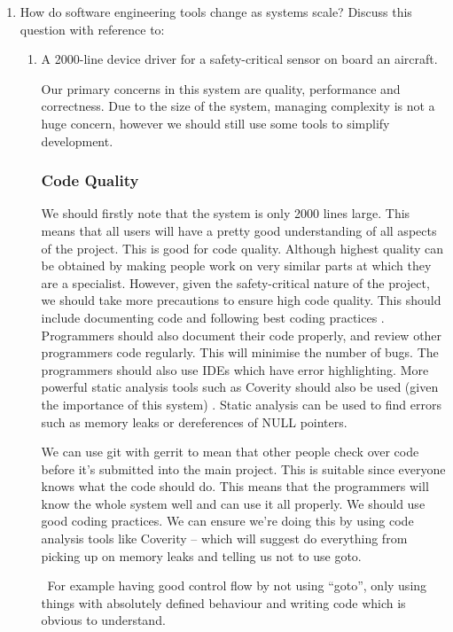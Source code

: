 \documentclass[10pt,\jkfside,a4paper]{article}
\begin{document}
\begin{enumerate}

\item How do software engineering tools change as systems scale?
Discuss this question with reference to:

\begin{enumerate}[label=(\alph*)]

\item A 2000-line device driver for a safety-critical sensor on board an aircraft.

Our primary concerns in this system are quality, performance and correctness.
Due to the size of the system, managing complexity is not a huge concern, however
we should still use some tools to simplify development.

\subsubsection*{Code Quality}

We should firstly note that the system is only 2000 lines large.
This means that all users will have a pretty good understanding of all aspects of the project.
This is good for code quality.
Although highest quality can be obtained by making people work on very similar parts at which they are a specialist.
However, given the safety-critical nature of the project, we should take more precautions to ensure high code quality.
This should include documenting code and following best coding practices \dag.
Programmers should also document their code properly, and review other programmers code regularly. This will minimise
the number of bugs. The programmers should also use IDEs which have error highlighting.
More powerful static analysis tools such as Coverity should also be used (given the importance of this system) .
Static analysis can be used to find errors such as memory leaks or dereferences of NULL pointers.

We can use git with gerrit to mean that other people check over code before it's submitted into the main project.
This is suitable since everyone knows what the code should do.
This means that the programmers will know the whole system well and can use it all properly.
We should use good coding practices.
We can ensure we're doing this by using code analysis tools like Coverity -- which will suggest
do everything from picking up on memory leaks and telling us not to use goto.

\dag \ For example having good control flow by not using ``goto'', only using things with absolutely defined
behaviour and writing code which is obvious to understand.


\end{enumerate}
\end{enumerate}
\end{document}

